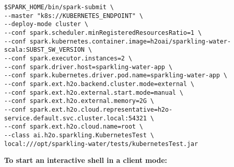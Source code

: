 \begin{lstlisting}[style=Bash]
$SPARK_HOME/bin/spark-submit \
--master "k8s://KUBERNETES_ENDPOINT" \
--deploy-mode cluster \
--conf spark.scheduler.minRegisteredResourcesRatio=1 \
--conf spark.kubernetes.container.image=h2oai/sparkling-water-scala:SUBST_SW_VERSION \
--conf spark.executor.instances=2 \
--conf spark.driver.host=sparkling-water-app \
--conf spark.kubernetes.driver.pod.name=sparkling-water-app \
--conf spark.ext.h2o.backend.cluster.mode=external \
--conf spark.ext.h2o.external.start.mode=manual \
--conf spark.ext.h2o.external.memory=2G \
--conf spark.ext.h2o.cloud.representative=h2o-service.default.svc.cluster.local:54321 \
--conf spark.ext.h2o.cloud.name=root \
--class ai.h2o.sparkling.KubernetesTest \
local:///opt/sparkling-water/tests/kubernetesTest.jar
\end{lstlisting}

\textbf{To start an interactive shell in a client mode:}

